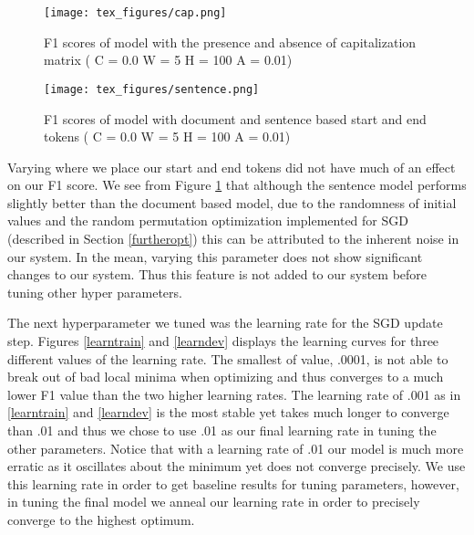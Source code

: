 \documentclass{article}
\begin{document}
\begin{figure}[ht]
\begin{minipage}[b]{0.45\linewidth}
\centering
\texttt{[image: tex\_figures/cap.png]}
\caption{F1 scores of model with the presence and absence of capitalization matrix ( C = 0.0 W = 5 H = 100 A = 0.01)}
\label{capfig}
\end{minipage}
\hspace{0.5cm}
\begin{minipage}[b]{0.45\linewidth}
\centering
\texttt{[image: tex\_figures/sentence.png]}
\caption{F1 scores of model with document and sentence based start and end tokens ( C = 0.0 W = 5 H = 100 A = 0.01)}
\label{sentencefig}
\end{minipage}
\end{figure}


Varying where we place our start and end tokens did not have much of an effect on our F1 score. We see from Figure \ref{sentencefig} that although the sentence model performs slightly better than the document based model, due to the randomness of initial values and the random permutation optimization implemented for SGD (described in Section \ref{furtheropt}) this can be attributed to the inherent noise in our system. In the mean, varying this parameter does not show significant changes to our system. Thus this feature is not added to our system before tuning other hyper parameters.





The next hyperparameter we tuned was the learning rate for the SGD update step.  Figures \ref{learntrain} and \ref{learndev} displays the learning curves for three different values of the learning rate.  The smallest of value, .0001, is not able to break out of bad local minima when optimizing and thus converges to a much lower F1 value than the two higher learning rates.  The learning rate of .001 as in \ref{learntrain} and \ref{learndev} is the most stable yet takes much longer to converge than .01 and thus we chose to use .01 as our final learning rate in tuning the other parameters.  Notice that with a learning rate of .01 our model is much more erratic as it oscillates about the minimum yet does not converge precisely.  We use this learning rate in order to get baseline results for tuning parameters, however, in tuning the final model we anneal our learning rate in order to precisely converge to the highest optimum.
\end{document}
